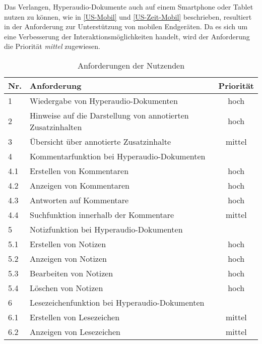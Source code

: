 Das Verlangen, Hyperaudio-Dokumente auch auf einem Smartphone oder Tablet nutzen zu können, wie in \ref{US-Mobil} und \ref{US-Zeit-Mobil} beschrieben, resultiert in der Anforderung zur Unterstützung von mobilen Endgeräten. Da es sich um eine Verbesserung der Interaktionsmöglichkeiten handelt, wird der Anforderung die Priorität \textit{mittel} zugewiesen.

\begin{table}[!ht]
\def\arraystretch{1.4}
\caption{Anforderungen der Nutzenden}
\label{tab:AnforderungenNutzenden}
\begin{tabularx}{\textwidth}{lXc}      
    \hline
    Nr. & Anforderung & Priorität
    \\\hline
    1 & Wiedergabe von Hyperaudio-Dokumenten & hoch\\
    2 & Hinweise auf die Darstellung von annotierten Zusatzinhalten & hoch\\
    3 & Übersicht über annotierte Zusatzinhalte & mittel\\
    4 & Kommentarfunktion bei Hyperaudio-Dokumenten & \\
    4.1 & \hspace*{0.5cm} Erstellen von Kommentaren & hoch\\
    4.2 & \hspace*{0.5cm} Anzeigen von Kommentaren & hoch\\
    4.3 & \hspace*{0.5cm} Antworten auf Kommentare & hoch\\
    4.4 & \hspace*{0.5cm} Suchfunktion innerhalb der Kommentare & mittel\\ 
    5 & Notizfunktion bei Hyperaudio-Dokumenten & \\
    5.1 & \hspace*{0.5cm} Erstellen von Notizen & hoch\\
    5.2 & \hspace*{0.5cm} Anzeigen von Notizen & hoch\\
    5.3 & \hspace*{0.5cm} Bearbeiten von Notizen & hoch\\
   	5.4 & \hspace*{0.5cm} Löschen von Notizen & hoch\\
    6 & Lesezeichenfunktion bei Hyperaudio-Dokumenten & \\
    6.1 & \hspace*{0.5cm} Erstellen von Lesezeichen & mittel\\
    6.2 & \hspace*{0.5cm} Anzeigen von Lesezeichen & mittel\\

\end{tabularx}
\end{table}
